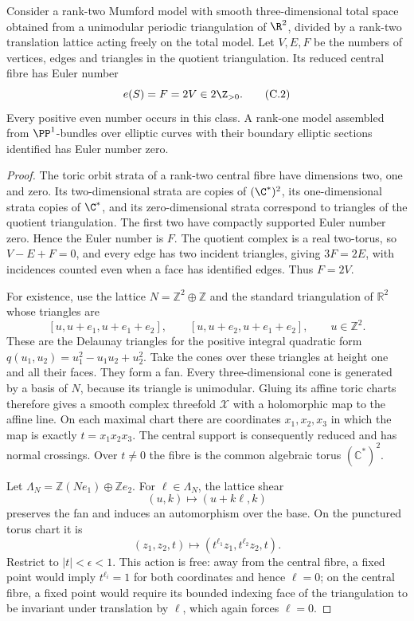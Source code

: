 
\begin{proposition}\label{cdp:st:C2c}
Consider a rank-two Mumford model with smooth three-dimensional total space obtained from a unimodular periodic triangulation of $\R^2$, divided by a rank-two translation lattice acting freely on the total model. Let $V,E,F$ be the numbers of vertices, edges and triangles in the quotient triangulation. Its reduced central fibre has Euler number
\[
 e(S)=F=2V\in2\Z_{>0}.                                \tag{C.2}\label{cdp:eq:C.2}
\]
Every positive even number occurs in this class. A rank-one model assembled from $\PP^1$-bundles over elliptic curves with their boundary elliptic sections identified has Euler number zero.
\end{proposition}
\begin{proof}
The toric orbit strata of a rank-two central fibre have dimensions two, one and zero. Its two-dimensional strata are copies of $(\C^*)^2$, its one-dimensional strata copies of $\C^*$, and its zero-dimensional strata correspond to triangles of the quotient triangulation. The first two have compactly supported Euler number zero. Hence the Euler number is $F$. The quotient complex is a real two-torus, so $V-E+F=0$, and every edge has two incident triangles, giving $3F=2E$, with incidences counted even when a face has identified edges. Thus $F=2V$.

For existence, use the lattice $N=\mathbb Z^2\oplus\mathbb Z$
and the standard triangulation of $\mathbb R^2$ whose triangles are
\[
 [u,u+e_1,u+e_1+e_2],\qquad
 [u,u+e_2,u+e_1+e_2],\qquad u\in\mathbb Z^2.
\]
These are the Delaunay triangles for the positive integral quadratic
form $q(u_1,u_2)=u_1^2-u_1u_2+u_2^2$.
Take the cones over these triangles at height one and all their
faces. They form a fan. Every three-dimensional cone is generated
by a basis of $N$, because its triangle is unimodular. Gluing its
affine toric charts therefore gives a smooth complex threefold
$\mathcal X$ with a holomorphic map to the affine line. On each
maximal chart there are coordinates $x_1,x_2,x_3$ in which the map
is exactly $t=x_1x_2x_3$. The central support is consequently
reduced and has normal crossings. Over $t\ne0$ the fibre is the
common algebraic torus $(\mathbb C^*)^2$.

Let $\Lambda_N=\mathbb Z(Ne_1)\oplus\mathbb Z e_2$.
For $\ell\in\Lambda_N$, the lattice shear
\[
 (u,k)\longmapsto(u+k\ell,k)
\]
preserves the fan and induces an automorphism over the base.
On the punctured torus chart it is
\[
 (z_1,z_2,t)\longmapsto
 (t^{\ell_1}z_1,t^{\ell_2}z_2,t).
\]
Restrict to $|t|<\epsilon<1$. This action is free: away from the
central fibre, a fixed point would imply $t^{\ell_i}=1$ for both
coordinates and hence $\ell=0$; on the central fibre, a fixed
point would require its bounded indexing face of the triangulation
to be invariant under translation by $\ell$, which again forces
$\ell=0$.


\end{proof}
